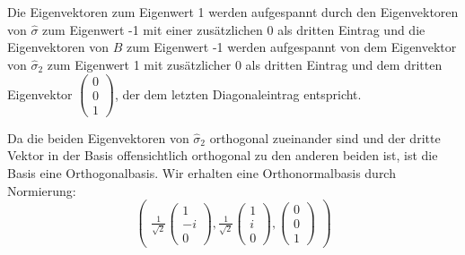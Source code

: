 \documentclass[11pt, ngerman, fleqn, DIV=15, headinclude]{scrartcl}
\begin{document}
Die Eigenvektoren zum Eigenwert 1 werden aufgespannt durch den Eigenvektoren von $\hat{\sigma}$ zum Eigenwert -1 mit einer zusätzlichen $0$ als dritten Eintrag und die Eigenvektoren von $\hat{B}$ zum Eigenwert -1 werden aufgespannt von dem Eigenvektor von $\hat{\sigma}_2$ zum Eigenwert 1 mit zusätzlicher $0$ als dritten Eintrag und dem dritten Eigenvektor $\begin{pmatrix}0\\0\\1\end{pmatrix}$, der dem letzten Diagonaleintrag entspricht. 

Da die beiden Eigenvektoren von $\hat{\sigma}_2$ orthogonal zueinander sind und der dritte Vektor in der Basis offensichtlich orthogonal zu den anderen beiden ist, ist die Basis eine Orthogonalbasis. Wir erhalten eine Orthonormalbasis durch Normierung:
\[
\begin{pmatrix}\frac{1}{\sqrt{2}}\begin{pmatrix}1\\-i\\0\end{pmatrix}, \frac{1}{\sqrt{2}}\begin{pmatrix}1\\i\\0\end{pmatrix},	\begin{pmatrix}0\\0\\1\end{pmatrix}\end{pmatrix}
\]
\end{document}
